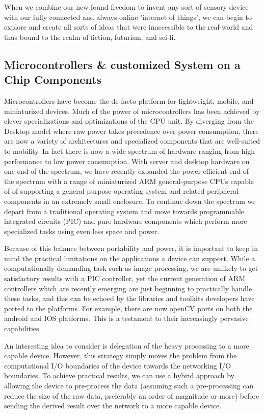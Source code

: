 \documentclass[a4paper,12pt]{report}
\begin{document}
When we combine our new-found freedom to invent any sort of sensory device with our fully connected and always online 'internet of things', we can begin to explore and create all sorts of ideas that were inaccessible to the real-world and thus bound to the realm of fiction, futurism, and sci-fi.
\subsection{Microcontrollers \& customized System on a Chip Components}

Microcontrollers have become the de-facto platform for lightweight, mobile, and miniaturized devices. Much of the power of microcontrollers has been achieved by clever specializations and optimizations of the CPU unit. By diverging from the Desktop model where raw power takes precedence over power consumption, there are now a variety of architectures and specialized components that are well-suited to mobility. In fact there is now a wide spectrum of hardware ranging from high performance to low power consumption. With server and desktop hardware on one end of the spectrum, we have recently expanded the power efficient end of the spectrum with a range of miniaturized ARM general-purpose CPUs capable of of supporting a general-purpose operating system and related peripheral components in an extremely small enclosure. To continue down the spectrum we depart from a traditional operating system and move towards programmable integrated circuits (PIC) and pure-hardware components which perform more specialized tasks using even less space and power.

Because of this balance between portability and power, it is important to keep in mind the practical limitations on the applications a device can support. While a computationally demanding task such as image processing, we are unlikely to get satisfactory results with a PIC controller, yet the current generation of ARM controllers which are recently emerging are just beginning to practically handle these tasks, and this can be echoed by the libraries and toolkits developers have ported to the platforms. For example, there are now openCV ports on both the android and IOS platforms. This is a testament to their increasingly pervasive capabilities.

An interesting idea to consider is delegation of the heavy processing to a more capable device. However, this strategy simply moves the problem from the computational I/O boundaries of the device towards the networking I/O boundaries. To achieve practical results, we can use a hybrid approach by allowing the device to pre-process the data (assuming such a pre-processing can reduce the size of the raw data, preferably an order of magnitude or more) before sending the derived result over the network to a more capable device.
\end{document}
